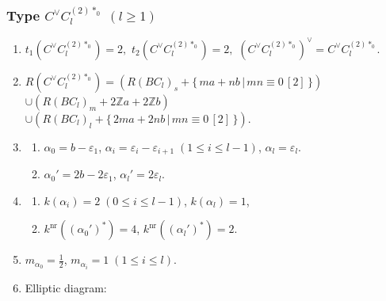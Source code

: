 \documentclass[11pt]{amsart}
\newcommand{\Z}{\mathbb{Z}}
\newcommand{\nr}{\mathrm{nr}}
\newcommand{\vep}{\varepsilon}
\begin{document}
{\subsubsection{Type $C^\vee C_l^{(2)\ast_{0}}$ $(l\geq 1)$}\label{data:CC-8}
\begin{enumerate}
\item $t_1(C^\vee C_l^{(2)\ast_{0}})=2,$ \quad $t_2(C^\vee C_l^{(2)\ast_{0}})=2,$ \quad $(C^\vee C_l^{(2)\ast_{0}})^\vee = C^\vee C_l^{(2)\ast_{0}}.$
\item $R(C^\vee C_l^{(2)\ast_{0}})=(R(BC_l)_s+\{ \,ma+nb\, \vert\, mn \equiv 0\, [2]\,\})$ \\ 
 $\cup (R(BC_l)_m+2\Z a+2\Z b)$ \\
 $\cup (R(BC_l)_l+\{ \,2ma+2nb\, \vert\, mn \equiv 0\, [2]\,\})$. 
\item 
\begin{enumerate}
\item[i)] $\alpha_0=b-\vep_1$, $\alpha_i=\vep_i-\vep_{i+1}\; 
(1\leq i \leq l-1)$, $\alpha_l=\vep_l$. 
\item[ii)] $\alpha_0'=2b-2\vep_1$, \; $\alpha_l'=2\vep_l$.
\end{enumerate}
\item 
\begin{enumerate}
\item[i)] $k(\alpha_i)=2\; (0\leq  i \leq l-1)$, \; $k(\alpha_l)=1$,
\item[ii)] $k^{\nr}((\alpha_0')^\ast)=4$, \; $k^{\nr}((\alpha_l')^\ast)=2$. 
\end{enumerate}
\item $m_{\alpha_0}=\frac{1}{2}$, \; $m_{\alpha_i}=1\; (1\leq i \leq l)$. 
\item Elliptic diagram: 




\begin{center}
\end{center}
\end{enumerate}}
\end{document}
